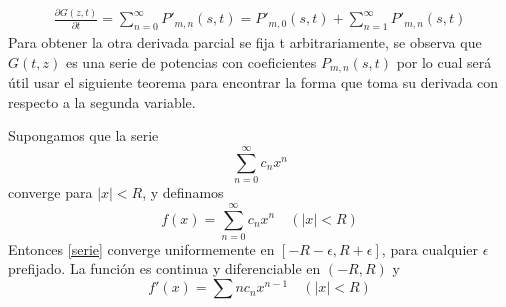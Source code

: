 \begin{eqnarray}
    \frac{\partial G(z,t)}{\partial t}=\sum_{n=0}^\infty P'_{m,n}(s,t)=P'_{m,0}(s,t)+\sum_{n=1}^\infty P'_{m,n}(s,t)
\end{eqnarray}
Para obtener la otra derivada parcial se fija t arbitrariamente, se observa que $G(t,z)$ es una serie de potencias con coeficientes $P_{m,n}(s,t)$ por lo cual será útil usar el siguiente teorema para encontrar la forma que toma su derivada con respecto a la segunda variable.
\begin{Teo}
    Supongamos que la serie \begin{equation}
    \sum_{n=0}^\infty c_n x^n\label{serie}
    \end{equation} converge para $|x|<R$, y definamos
    $$f(x)=\sum_{n=0}^\infty c_n x^n\quad(|x|<R)$$
    Entonces \ref{serie} converge uniformemente en $[-R-\epsilon,R+\epsilon]$, para cualquier $\epsilon$ prefijado. La función es continua y diferenciable en $(-R,R)$ y $$f'(x)=\sum n c_n x^{n-1}\quad(|x|<R)$$
\end{Teo} 